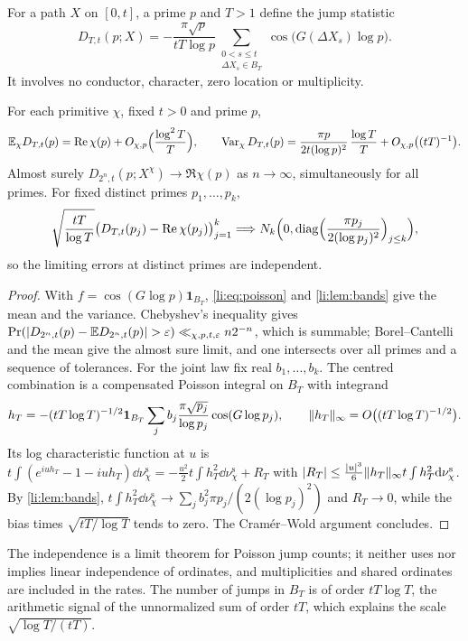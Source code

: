 For a path $X$ on $[0,t]$, a prime $p$ and $T>1$ define the jump statistic
\begin{equation}\label{li:eq:decoder}
 D_{T,t}(p;X)=-\frac{\pi\sqrt p}{tT\log p}\sum_{\substack{0<s\le t\\ \Delta X_s\in B_T}}\cos\bigl(G(\Delta X_s)\log p\bigr).
\end{equation}
It involves no conductor, character, zero location or multiplicity.

\begin{theorem}\label{li:thm:decoder}
For each primitive $\chi$, fixed $t>0$ and prime $p$,
\[
 \liEx_\chi D_{T,t}(p)=\Re\chi(p)+O_{\chi,p}\Bigl(\frac{\log^2T}T\Bigr),\qquad
 \operatorname{Var}_\chi D_{T,t}(p)=\frac{\pi p}{2t(\log p)^2}\,\frac{\log T}T+O_{\chi,p}\bigl((tT)^{-1}\bigr).
\]
Almost surely $D_{2^n,t}(p;X^\chi)\to\Re\chi(p)$ as $n\to\infty$, simultaneously for all primes. For fixed distinct
primes $p_1,\dots,p_k$,
\[
 \sqrt{\frac{tT}{\log T}}\bigl(D_{T,t}(p_j)-\Re\chi(p_j)\bigr)_{j=1}^k\Longrightarrow
 N_k\Bigl(0,\operatorname{diag}\Bigl(\frac{\pi p_j}{2(\log p_j)^2}\Bigr)_{j\le k}\Bigr),
\]
so the limiting errors at distinct primes are independent.
\end{theorem}

\begin{proof}
With $f=\cos(G\log p)\mathbf 1_{B_T}$, \eqref{li:eq:poisson} and \cref{li:lem:bands} give the mean and the variance.
Chebyshev's inequality gives
$\Pr(\abs{D_{2^n,t}(p)-\liEx D_{2^n,t}(p)}>\eps)\ll_{\chi,p,t,\eps}n2^{-n}$, which is summable; Borel--Cantelli and the mean give the almost sure limit, and one intersects over all primes and a
sequence of tolerances. For the joint law fix real $b_1,\dots,b_k$. The centred combination is a
compensated Poisson integral on $B_T$ with integrand
\[
 h_T=-(tT\log T)^{-1/2}\mathbf 1_{B_T}\sum_jb_j\frac{\pi\sqrt{p_j}}{\log p_j}\cos(G\log p_j),\qquad
 \norm{h_T}_\infty=O\bigl((tT\log T)^{-1/2}\bigr).
\]
Its log characteristic function at $u$ is
$t\int(e^{iuh_T}-1-iuh_T)\dd\nu^{\mathrm s}_\chi=-\frac{u^2}2t\int h_T^2\dd\nu^{\mathrm s}_\chi+R_T$ with
$\abs{R_T}\le\frac{\abs u^3}6\norm{h_T}_\infty t\int h_T^2\dd\nu^{\mathrm s}_\chi$. By \cref{li:lem:bands},
$t\int h_T^2\dd\nu^{\mathrm s}_\chi\to\sum_jb_j^2\pi p_j/(2(\log p_j)^2)$ and $R_T\to0$, while the bias times
$\sqrt{tT/\log T}$ tends to zero. The Cram\'er--Wold argument concludes.
\end{proof}

The independence is a limit theorem for Poisson jump counts; it neither uses nor implies linear
independence of ordinates, and multiplicities and shared ordinates are included in the rates. The
number of jumps in $B_T$ is of order $tT\log T$, the arithmetic signal of the unnormalized sum of order
$tT$, which explains the scale $\sqrt{\log T/(tT)}$.

